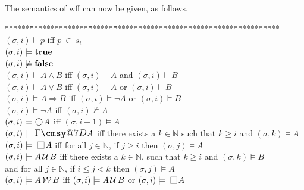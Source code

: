 \documentclass[nohyperref]{acmtrans2f}
\makeatletter
\def\sometime{\mathord{\hbox{\large$\mathchar"0\cmsy@7D$}}}
\newcommand{\always}{\raisebox{-.2ex}{
                           \mbox{\unitlength=0.9ex
                           \begin{picture}(2,2)
                           \linethickness{0.06ex}
                           \put(0,0){\line(1,0){2}}
                           \put(0,2){\line(1,0){2}}
                           \put(0,0){\line(0,1){2}}
                           \put(2,0){\line(0,1){2}}
                           \end{picture}}}
                          \,}
\newcommand{\next}{\!\raisebox{-.2ex}{ %
                        \mbox{\unitlength=0.9ex
                        \begin{picture}(2,2)
                        \linethickness{0.06ex}
                        \put(1,1){\circle{2}} %
                        \end{picture}}}       %
                        \,}
\def\until{\hbox{$\,\cal U \,$}}
\def\unless{\hbox{$\,\cal W \,$}}
\let\imp=\Rightarrow
\def\ltrue{\hbox{\rm\bf true}}
\def\lfalse{\hbox{\rm\bf false}}
\newcommand{\Nat}{\mbox{\(\mathbb N\)}}
\def\lstart{\hbox{\rm\bf start}}
\makeatother
\begin{document}
The semantics of {\sc wff\/} can now be given, as follows.
%
\begin{tabbing}
******\=**************\=******\=****************************************\kill
 \>$(\sigma, i) \models p$ \>iff \> $p ~ \in ~ s_{i}$ \qquad{}\\
%
 \>$(\sigma, i) \models \ltrue$\\
%
 \>$(\sigma, i) \not\models \lfalse$\\
%
 \>$(\sigma, i) \models A \land B$ \>iff \> $(\sigma, i) \models A$
 and $(\sigma, i) \models B$\\
%
 \>$(\sigma, i) \models A \lor B$ \>iff \> $(\sigma, i) \models A$ or
 $(\sigma, i) \models B$\\
%
 \>$(\sigma, i) \models A \imp B$ \>iff \> $(\sigma, i) \models \neg A$ or
 $(\sigma, i) \models B$\\
%
 \>$(\sigma, i) \models \neg A$ \>iff \> $(\sigma, i)\not\models A$\\ 
%
%
 \>$(\sigma, i) \models \next A$ \>iff \> $(\sigma, i + 1) \models A$\\
%
 \>$(\sigma, i) \models \sometime A$ \>iff \> there exists a $k\in\Nat$ such
 that $k \geqslant i$ and $(\sigma, k) \models A$\\
%
 \>$(\sigma, i) \models \always A$ \>iff \> for all $j\in\Nat$, if $j
 \geqslant i$ then $(\sigma, j) \models A$\\
%
 \>$(\sigma, i) \models A \until B$ \>iff \> there exists a
 $k\in\Nat$, such that $k \geqslant i$ and $(\sigma, k) \models B$\\
 \>\>\> \qquad and for all $j\in\Nat$, if $i \leqslant j < k$ then $(\sigma,
 j) \models A$\\ 
%
 \>$(\sigma, i) \models A \unless B$ \>iff \> $(\sigma, i)
 \models A \until B$ or $(\sigma, i) \models \always A$ 
\end{tabbing}
%
\end{document}

